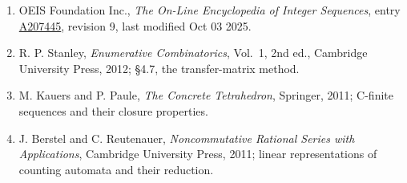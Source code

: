 \documentclass[11pt]{article}
\theoremstyle{definition}
\begin{document}
\begin{enumerate}

\item OEIS Foundation Inc., \emph{The On-Line Encyclopedia of Integer Sequences}, entry \href{https://oeis.org/A207445}{A207445}, revision 9, last modified Oct 03 2025.

\item R. P. Stanley, \emph{Enumerative Combinatorics}, Vol.~1, 2nd ed., Cambridge University Press, 2012; \S4.7, the transfer-matrix method.

\item M. Kauers and P. Paule, \emph{The Concrete Tetrahedron}, Springer, 2011; C-finite sequences and their closure properties.

\item J. Berstel and C. Reutenauer, \emph{Noncommutative Rational Series with Applications}, Cambridge University Press, 2011; linear representations of counting automata and their reduction.

\end{enumerate}
\end{document}
